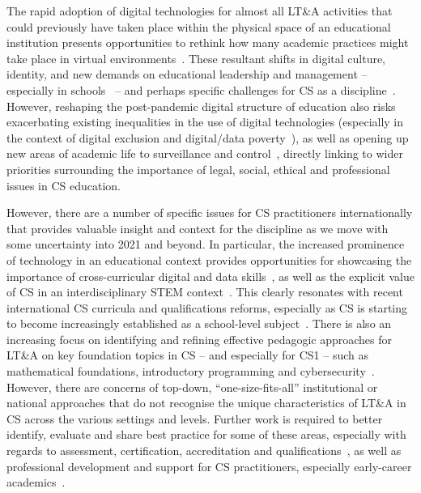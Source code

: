 \documentclass[conference]{IEEEtran}
\begin{document}
The rapid adoption of digital technologies for almost all LT\&A
activities that could previously have taken place within the physical
space of an educational institution presents opportunities to rethink
how many academic practices might take place in virtual
environments~\cite{itnowdigedu:2021}. These resultant shifts in digital
culture, identity, and new demands on educational leadership and
management -- especially in
schools~\cite{slameditorial:2020,crick:berari2020} -- and perhaps
specific challenges for CS as a
discipline~\cite{crick-et-al:ukicer2020,crick-et-alposter:sigcse2021}. However,
reshaping the post-pandemic digital structure of education also risks
exacerbating existing inequalities in the use of digital technologies
(especially in the context of digital exclusion and digital/data
poverty~\cite{watts:2020,beaunoyer-et-al:2020}), as well as opening up
new areas of academic life to surveillance and
control~\cite{williamson-et-al:2020}, directly linking to wider
priorities surrounding the importance of legal, social, ethical and
professional issues in CS education.

However, there are a number of specific issues for CS practitioners
internationally that provides valuable insight and context for the
discipline as we move with some uncertainty into 2021 and beyond. In
particular, the increased prominence of technology in an educational
context provides opportunities for showcasing the importance of
cross-curricular digital and data skills~\cite{crick:berari2020}, as
well as the explicit value of CS in an interdisciplinary STEM
context~\cite{moller+crick:jce2018}. This clearly resonates with
recent international CS curricula and qualifications reforms,
especially as CS is starting to become increasingly established as a
school-level
subject~\cite{bell:2014,brown-et-al-toce2014,gal-ezer+stephenson:2014,raman-et-al:2015}.
There is also an increasing focus on identifying and refining
effective pedagogic approaches for LT\&A on key foundation topics in
CS -- and especially for CS1 -- such as mathematical foundations,
introductory programming and
cybersecurity~\cite{davenport-et-al:latice2016,murphy-et-al:programming2017,simon-et-al:sigcse2018,davenport+crick:fmfun2021,crick-et-al:fie2020,prickett-et-al:iticse2020}. However,
there are concerns of top-down, ``one-size-fits-all'' institutional or
national approaches that do not recognise the unique characteristics
of LT\&A in CS across the various settings and levels. Further work is
required to better identify, evaluate and share best practice for some
of these areas, especially with regards to assessment, certification,
accreditation and
qualifications~\cite{crick-et-al:fie2019,itnowcyber:2019,crick-et-al-accred:cep2020,itnowaccred:2020},
as well as professional development and support for CS practitioners,
especially early-career academics~\cite{ukicerwshop:2020,crick-et-al-ecl:cep2021}.
\end{document}
